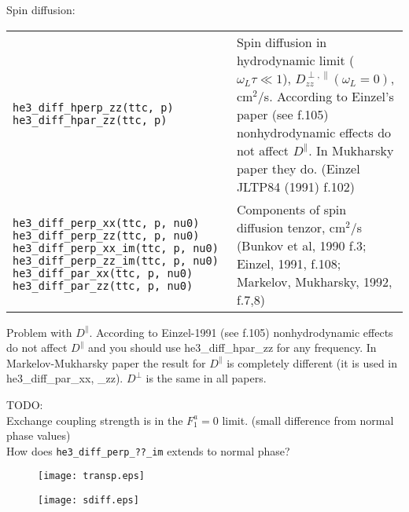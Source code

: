\documentclass[a4paper]{article}
\begin{document}
Spin diffusion:

\medskip
\noindent\begin{tabular}{p{6cm}p{10cm}}
\tt he3\_diff\_hperp\_zz(ttc, p)\newline
\tt he3\_diff\_hpar\_zz(ttc, p)
& Spin diffusion in hydrodynamic limit ($\omega_L \tau \ll 1$),
  $D^{\perp,\parallel}_{zz}(\omega_L=0)$, cm$^2$/s. According to Einzel's
  paper (see f.105) nonhydrodynamic effects do not affect $D^\parallel$.
  In Mukharsky paper they do.\newline
  {(\small Einzel JLTP84 (1991) f.102)}\\

\tt he3\_diff\_perp\_xx(ttc, p, nu0)\newline
\tt he3\_diff\_perp\_zz(ttc, p, nu0)\newline
\tt he3\_diff\_perp\_xx\_im(ttc, p, nu0)\newline
\tt he3\_diff\_perp\_zz\_im(ttc, p, nu0)\newline
\tt he3\_diff\_par\_xx(ttc, p, nu0)\newline
\tt he3\_diff\_par\_zz(ttc, p, nu0)\newline
&Components of spin diffusion tenzor, cm$^2$/s\newline
{\small(Bunkov et al, 1990 f.3; Einzel, 1991, f.108;\newline
Markelov, Mukharsky, 1992, f.7,8)}\\
\end{tabular}
\medskip

Problem with $D^\parallel$. According to Einzel-1991 (see f.105)
nonhydrodynamic effects do not affect $D^\parallel$ and you should use
he3\_diff\_hpar\_zz for any frequency.
In Markelov-Mukharsky paper the result for $D^\parallel$ is completely
different (it is used in he3\_diff\_par\_xx, \_zz).
$D^\perp$ is the same in all papers.


\noindent TODO:\\
Exchange coupling strength is in the $F_1^a = 0$ limit. (small difference from normal phase values)\\
How does {\tt he3\_diff\_perp\_??\_im} extends to normal phase?\\

\begin{figure}[p]
\texttt{[image: transp.eps]}\\
\end{figure}
\begin{figure}[p]
\texttt{[image: sdiff.eps]}\\
\end{figure}
\end{document}
